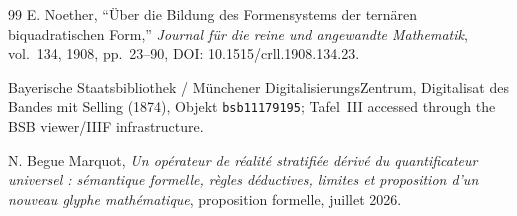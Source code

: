\documentclass[11pt,a4paper]{article}
\begin{document}
\begin{thebibliography}{99}
E. Noether, ``Über die Bildung des Formensystems der ternären biquadratischen Form,''
\emph{Journal für die reine und angewandte Mathematik}, vol.~134, 1908, pp.~23--90,
DOI: 10.1515/crll.1908.134.23.

Bayerische Staatsbibliothek / Münchener DigitalisierungsZentrum,
Digitalisat des Bandes mit Selling (1874), Objekt \texttt{bsb11179195}; Tafel~III accessed through the BSB viewer/IIIF infrastructure.

N. Begue Marquot, \emph{Un opérateur de réalité stratifiée dérivé du quantificateur universel : sémantique formelle, règles déductives, limites et proposition d'un nouveau glyphe mathématique}, proposition formelle, juillet 2026.
\end{thebibliography}
\end{document}
